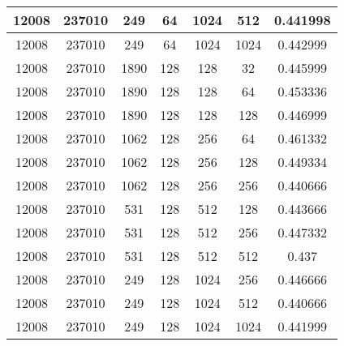 \documentclass[9pt]{article}
\begin{document}
\begin{tabular}{|c|c|c|c|c|c|c| }
\hline
12008  & 237010  & 249  & 64  & 1024  & 512  & 0.441998 \\
\hline
12008  & 237010  & 249  & 64  & 1024  & 1024  & 0.442999 \\
\hline
12008  & 237010  & 1890  & 128  & 128  & 32  & 0.445999 \\
\hline
12008  & 237010  & 1890  & 128  & 128  & 64  & 0.453336 \\
\hline
12008  & 237010  & 1890  & 128  & 128  & 128  & 0.446999 \\
\hline
12008  & 237010  & 1062  & 128  & 256  & 64  & 0.461332 \\
\hline
12008  & 237010  & 1062  & 128  & 256  & 128  & 0.449334 \\
\hline
12008  & 237010  & 1062  & 128  & 256  & 256  & 0.440666 \\
\hline
12008  & 237010  & 531  & 128  & 512  & 128  & 0.443666 \\
\hline
12008  & 237010  & 531  & 128  & 512  & 256  & 0.447332 \\
\hline
12008  & 237010  & 531  & 128  & 512  & 512  & 0.437 \\
\hline
12008  & 237010  & 249  & 128  & 1024  & 256  & 0.446666 \\
\hline
12008  & 237010  & 249  & 128  & 1024  & 512  & 0.440666 \\
\hline
12008  & 237010  & 249  & 128  & 1024  & 1024  & 0.441999 \\
\hline
\end{tabular}
 
\end{document}
